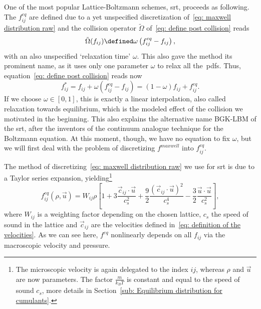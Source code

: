 One of the most popular Lattice-Boltzmann schemes, \gls{srt}, proceeds as following.
The $f_{ij}^{eq}$ are defined due to a yet unspecified discretization of~\eqref{eq: maxwell distribution raw} and the collision operator $\tilde{\Omega}$ of~\eqref{eq: define post collision} reads
\begin{equation}
  \tilde{\Omega}(f_{ij}) \defined \omega \left(f_{ij}^{eq} - f_{ij}\right),
\end{equation}
with an also unspecified `relaxation time' $\omega$.
This also gave the method its prominent name, as it uses only one parameter $\omega$ to relax all the~\glspl{pdf}.
Thus, equation~\eqref{eq: define post collision} reads now
\begin{equation}
  \label{eq: post collision discrete}
  f_{ij}^* = f_{ij} + \omega \left(f_{ij}^{eq} - f_{ij}\right) = (1-\omega)f_{ij} + f_{ij}^{eq}.
\end{equation}
If we choose $\omega\in[0,1]$, this is exactly a linear interpolation, also called relaxation towards equilibrium, which is the modeled effect of the collision we motivated in the beginning.
This also explains the alternative name BGK-LBM of the \gls{srt}, after the inventors of the continuum analogue technique for the Boltzmann equation.
At this moment, though, we have no equation to fix $\omega$, but we will first deal with the problem of discretizing $f^{maxwell}$ into $f_{ij}^{eq}$.

The method of discretizing~\eqref{eq: maxwell distribution raw} we use for \gls{srt} is due to a Taylor series expansion, yielding\footnote{The microscopic velocity is again delegated to the index $ij$, whereas $\rho$ and $\vec{u}$ are now parameters.
The factor $\frac{m}{k_B T}$ is constant and equal to the speed of sound $c_s$, more details in Section~\ref{sub: Equilibrium distribution for cumulants}.}
\begin{equation}
  \label{eq: equilibrium particle distributions}
  f_{ij}^{eq}(\rho,\vec{u}) = W_{ij}\rho
  \left[
    1
    + 3\frac{\vec{c}_{ij} \cdot \vec{u}}{c_s^2}
    + \frac{9}{2}\frac{{(\vec{c}_{ij} \cdot \vec{u})}^2}{c_s^4}
    - \frac{3}{2}\frac{\vec{u} \cdot \vec{u}}{c_s^2}
  \right],
\end{equation}
where $W_{ij}$ is a weighting factor depending on the chosen lattice, $c_s$ the speed of sound in the lattice and $\vec{c}_{ij}$ are the velocities defined in~\eqref{eq: definition of the velocities}.
As we can see here, $f^{eq}$ nonlinearly depends on all $f_{ij}$ via the macroscopic velocity and pressure.

